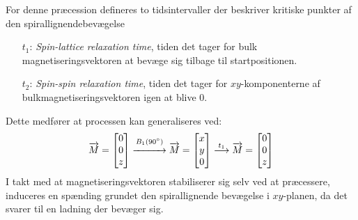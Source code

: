     For denne præcession defineres to tidsintervaller der beskriver kritiske punkter af den spirallignendebevægelse
    \begin{itemize}
        \item[$t_1$:] \textit{Spin-lattice relaxation time}, tiden det tager for bulk magnetiseringsvektoren at bevæge sig tilbage til startpositionen.
        \item[$t_2$:] \textit{Spin-spin relaxation time}, tiden det tager for $xy$-komponenterne af bulkmagnetiseringsvektoren igen at blive 0. 
    \end{itemize}
    Dette medfører at processen kan generaliseres ved:
    \[
        \overrightarrow{M}=
        \begin{bmatrix}
            0 \\
            0 \\
            z
        \end{bmatrix}
        \stackrel{B_1(90\degree)}{\xrightarrow{\hspace{1cm}}}
        \overrightarrow{M}=
        \begin{bmatrix}
            x \\
            y \\
            0
        \end{bmatrix}
        \stackrel{t_1}{\longrightarrow}
        \overrightarrow{M}=
        \begin{bmatrix}
            0 \\
            0 \\
            z
        \end{bmatrix}
    \]
    I takt med at magnetiseringsvektoren stabiliserer sig selv ved at præcessere, induceres en spænding grundet den spirallignende bevægelse i $xy$-planen, da det svarer til en ladning der bevæger sig.     
